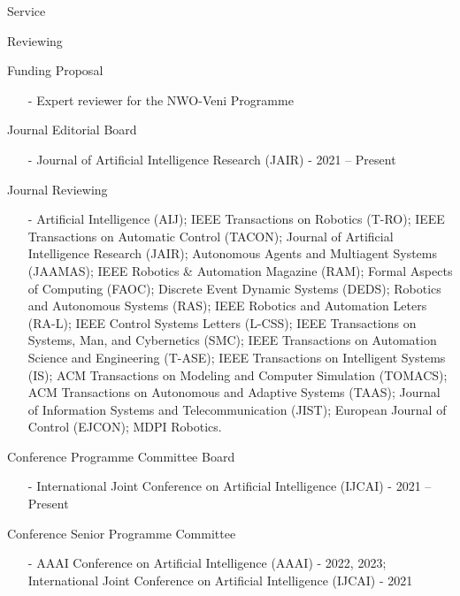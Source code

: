 \begin{rSection}{Service}
\begin{rSubsection}{Reviewing}{}{}{}
\item Funding Proposal
\begin{itemize}
\vspace*{-0.2cm}
\item[-] Expert reviewer for the NWO-Veni Programme
\end{itemize}

\item Journal Editorial Board
\begin{itemize}
\vspace*{-0.2cm}
\item[-] Journal of Artificial Intelligence Research (JAIR) - 2021 -- Present 
\end{itemize}

\item Journal Reviewing
\begin{itemize}
\vspace*{-0.2cm}
\item[-]  Artificial Intelligence (AIJ); IEEE Transactions on Robotics (T-RO); IEEE Transactions on Automatic Control (TACON); Journal of Artificial Intelligence Research (JAIR); Autonomous Agents and Multiagent Systems (JAAMAS); IEEE Robotics \& Automation Magazine (RAM); Formal Aspects of Computing (FAOC); Discrete Event Dynamic Systems (DEDS); Robotics and Autonomous Systems (RAS); IEEE Robotics and Automation Leters (RA-L); IEEE Control Systems Letters (L-CSS);  IEEE Transactions on Systems, Man, and Cybernetics (SMC);  IEEE Transactions on Automation Science and Engineering (T-ASE); IEEE Transactions on Intelligent Systems (IS); ACM Transactions on Modeling and Computer Simulation (TOMACS); ACM Transactions on Autonomous and Adaptive Systems (TAAS); Journal of Information Systems and Telecommunication (JIST); European Journal of Control  (EJCON); MDPI Robotics.
\end{itemize}

\item{Conference Programme Committee Board}
\begin{itemize}
\vspace*{-0.2cm}
\item[-]  International Joint Conference on Artificial Intelligence (IJCAI) - 2021 -- Present
\end{itemize}

\item{Conference Senior Programme Committee}
\begin{itemize}
\vspace*{-0.2cm}
\item[-]  AAAI Conference on Artificial Intelligence (AAAI) - 2022, 2023; International Joint Conference on Artificial Intelligence (IJCAI) - 2021
\end{itemize}


\end{rSubsection}
\end{rSection}
